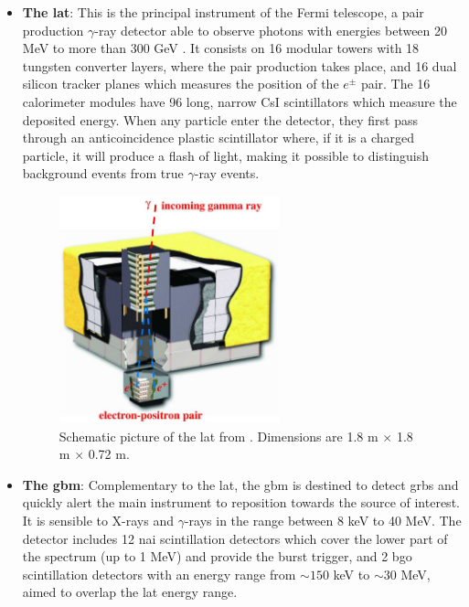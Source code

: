 \documentclass[main.tex]{subfiles}
\begin{document}
\begin{itemize}
    \item \textbf{The \gls{lat}}: This is the principal instrument of the Fermi telescope, a pair production $\gamma$-ray detector able to observe photons with energies between 20 MeV to more than 300 GeV \cite{2009FermiLAT}. It consists on 16 modular towers with 18 tungsten converter layers, where the pair production takes place, and 16 dual silicon tracker planes which measures the position of the $e^{\pm}$ pair. The 16 calorimeter modules have 96 long, narrow CsI scintillators which measure the deposited energy. When any particle enter the detector, they first pass through an anticoincidence plastic scintillator where, if it is a charged particle, it will produce a flash of light, making it possible to distinguish background events from true $\gamma$-ray events.\\
    
    \begin{figure}
    \centering
    \includegraphics[width=0.60\textwidth]{Pictures/LAT.pdf}
    \caption{Schematic picture of the \gls{lat} from \cite{2009FermiLAT}. Dimensions are 1.8 m $\times$ 1.8 m $\times$ 0.72 m.}
    \label{fig:LAT}
    \end{figure}
    
    \item \textbf{The \gls{gbm}}: Complementary to the \gls{lat}, the \gls{gbm} is destined to detect \glspl{grb} and quickly alert the main instrument to reposition towards the source of interest. It is sensible to X-rays and $\gamma$-rays in the range between 8 keV to 40 MeV. The detector includes 12  \gls{nai}  scintillation detectors which cover the lower part of the spectrum (up to 1 MeV) and  provide the burst trigger, and 2 \gls{bgo} scintillation detectors with an energy range from $\sim 150$ keV to $\sim 30$ MeV, aimed to overlap the \gls{lat} energy range. 
    

\end{itemize}
\end{document}
